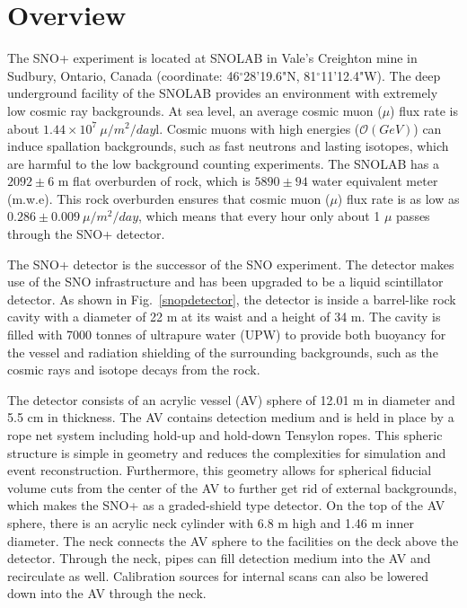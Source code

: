 

\section{Overview}\label{overview}
The SNO+ experiment is located at SNOLAB in Vale's Creighton mine in Sudbury, Ontario, Canada (coordinate: 46$^\circ$28'19.6"N, 81$^\circ$11'12.4"W). The deep underground facility of the SNOLAB provides an environment with extremely low cosmic ray backgrounds. At sea level, an average cosmic muon ($\mu$) flux rate is about $1.44\times 10^7~\mu/m^2/day$l\cite{muonflux}. Cosmic muons with high energies ($\mathcal{O}(GeV)$) can induce spallation backgrounds, such as fast neutrons and lasting isotopes, which are harmful to the low background counting experiments\cite{beacom2017physics}. The SNOLAB has a $2092\pm6$ m flat overburden of rock, which is $5890\pm94$ water equivalent meter (m.w.e). This rock overburden ensures that cosmic muon ($\mu$) flux rate is as low as $0.286\pm0.009~\mu/m^2/day$, which means that every hour only about 1 $\mu$ passes through the SNO+ detector. 

The SNO+ detector is the successor of the SNO experiment. The detector makes use of the SNO infrastructure and has been upgraded to be a liquid scintillator detector. As shown in Fig.~\ref{snopdetector}, the detector is inside a barrel-like rock cavity with a diameter of 22 m at its waist and a
height of 34 m. The cavity is filled with 7000 tonnes of ultrapure water (UPW) to provide both buoyancy for the vessel and radiation shielding of the surrounding backgrounds, such as the cosmic rays and isotope decays from the rock. 

The detector consists of an acrylic vessel (AV) sphere of 12.01 m in diameter and 5.5 cm in thickness. The AV contains detection medium and is held in place by a rope net system including hold-up and hold-down Tensylon ropes. This spheric structure is simple in geometry and reduces the complexities for simulation and event reconstruction. Furthermore, this geometry allows for spherical fiducial volume cuts from the center of the AV to further get rid of external backgrounds, which makes the SNO+ as a graded-shield type detector\cite{waterfield2017optical}.
On the top of the AV sphere, there is an acrylic neck cylinder with 6.8 m high and 1.46 m inner diameter. The neck connects the AV sphere to the facilities on the deck above the detector. Through the neck, pipes can fill detection medium into the AV and recirculate as well. Calibration sources for internal scans can also be lowered down into the AV through the neck.

